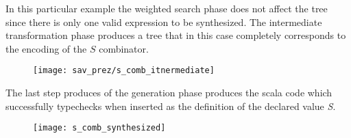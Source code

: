 In this particular example the weighted search phase does not affect the tree since there is only one valid expression to be synthesized. 
The intermediate transformation phase produces a tree that in this case completely corresponds to the \LC encoding of the $S$ combinator.

\begin{figure}[ht]
\centering
\texttt{[image: sav\_prez/s\_comb\_itnermediate]}
\end{figure} 

The last step produces of the generation phase produces the scala code which successfully typechecks when inserted as the definition of the declared value \textit{S}. 

\begin{figure}[ht]
\centering
\texttt{[image: s\_comb\_synthesized]}
\end{figure} 
